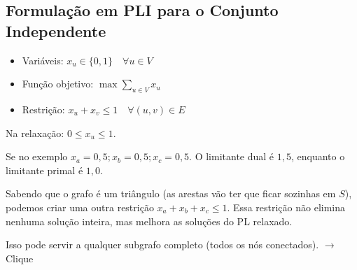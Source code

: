 \subsection{Formulação em PLI para o Conjunto Independente}

\begin{itemize}
    \item Variáveis: $x_u \in \{0, 1\} \quad \forall u \in V$
    \item Função objetivo: $\max \sum_{u \in V}x_u$
    \item Restrição: $x_u + x_v \leq 1 \quad \forall (u, v) \in E$
\end{itemize}

Na relaxação: $0 \leq x_u \leq 1$.

\begin{example}
    \begin{center}
    \end{center}
\end{example}

Se no exemplo $x_a = 0,5; x_b=0,5; x_c=0,5$. O limitante dual é $1,5$, enquanto o limitante primal é $1,0$.

Sabendo que o grafo é um triângulo (as arestas vão ter que ficar sozinhas em $S$), podemos criar uma outra restrição $x_a + x_b + x_c \leq 1$. Essa restrição não elimina nenhuma solução inteira, mas melhora as soluções do PL relaxado.

Isso pode servir a qualquer subgrafo completo (todos os nós conectados). $\rightarrow$ Clique
